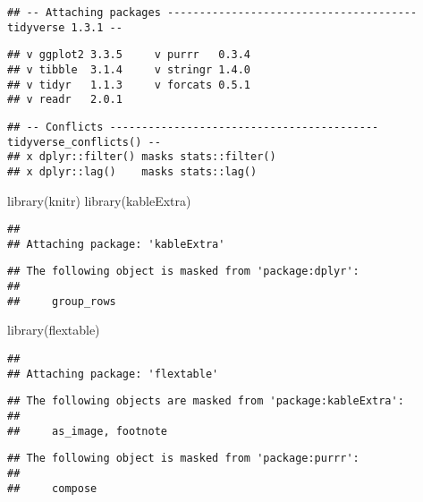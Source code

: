 \documentclass[
]{article}
\newenvironment{Shaded}{\begin{snugshade}}{\end{snugshade}}
\newcommand{\FunctionTok}[1]{\textcolor[rgb]{0.00,0.00,0.00}{#1}}
\newcommand{\NormalTok}[1]{#1}
\begin{document}
\begin{verbatim}
## -- Attaching packages --------------------------------------- tidyverse 1.3.1 --
\end{verbatim}

\begin{verbatim}
## v ggplot2 3.3.5     v purrr   0.3.4
## v tibble  3.1.4     v stringr 1.4.0
## v tidyr   1.1.3     v forcats 0.5.1
## v readr   2.0.1
\end{verbatim}

\begin{verbatim}
## -- Conflicts ------------------------------------------ tidyverse_conflicts() --
## x dplyr::filter() masks stats::filter()
## x dplyr::lag()    masks stats::lag()
\end{verbatim}

\begin{Shaded}
\begin{Highlighting}[]
\FunctionTok{library}\NormalTok{(knitr)}
\FunctionTok{library}\NormalTok{(kableExtra)}
\end{Highlighting}
\end{Shaded}

\begin{verbatim}
## 
## Attaching package: 'kableExtra'
\end{verbatim}

\begin{verbatim}
## The following object is masked from 'package:dplyr':
## 
##     group_rows
\end{verbatim}

\begin{Shaded}
\begin{Highlighting}[]
\FunctionTok{library}\NormalTok{(flextable)}
\end{Highlighting}
\end{Shaded}

\begin{verbatim}
## 
## Attaching package: 'flextable'
\end{verbatim}

\begin{verbatim}
## The following objects are masked from 'package:kableExtra':
## 
##     as_image, footnote
\end{verbatim}

\begin{verbatim}
## The following object is masked from 'package:purrr':
## 
##     compose
\end{verbatim}
\end{document}
